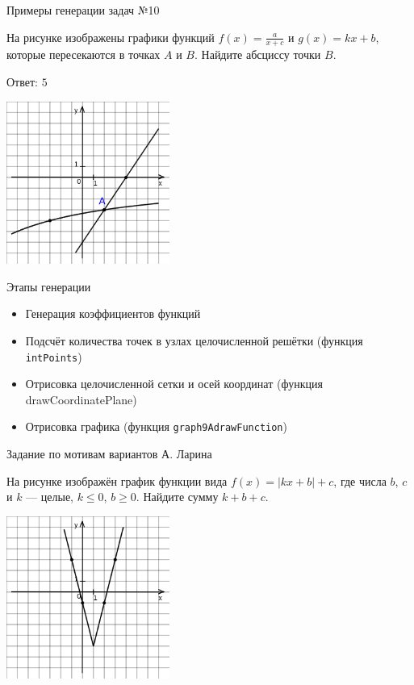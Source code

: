 \documentclass[aspectratio=169]{beamer}
\begin{document}
\begin{frame}{Примеры генерации задач №10}
    \begin{multicols}{2}
        На рисунке изображены графики функций $f(x)=\frac{a}{x+c}$ и $g(x)=kx+b$, которые пересекаются в точках $A$ и $B$. Найдите абсциссу точки $B$.

        Ответ: $5$

        \includegraphics[width=0.4\textwidth]{images/17222136364202n0.png}
    \end{multicols}
    

\end{frame}

\begin{frame}{Этапы генерации}
    \begin{itemize}
        \item Генерация коэффициентов функций
        \item Подсчёт количества точек в узлах целочисленной решётки (функция \texttt{intPoints})
        \item Отрисовка целочисленной сетки и осей координат (функция drawCoordinatePlane)
        \item Отрисовка графика (функция \texttt{graph9AdrawFunction})
    \end{itemize}
    
\end{frame}

\begin{frame}{Задание по мотивам вариантов А. Ларина}

    \begin{multicols}{2}
        На рисунке изображён график функции вида $f(x)=|kx+b|+c$, где числа $b$, $c$ и $k$ — целые, $k \leq 0$, $b\geq0$. Найдите сумму $k+b+c$.

        \includegraphics[width=0.4\textwidth]{images/453912618511153n0.png}
    
    \end{multicols}
    
        
    

\end{frame}
\end{document}
